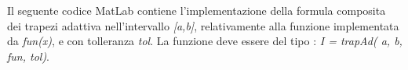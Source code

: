 Il seguente codice MatLab contiene l'implementazione della formula composita dei trapezi adattiva nell'intervallo \textit{[a,b]}, relativamente alla funzione implementata da \textit{fun(x)}, e con tolleranza \textit{tol}. La funzione deve essere del tipo : \textit{I = trapAd( a, b, fun, tol)}.\\\
